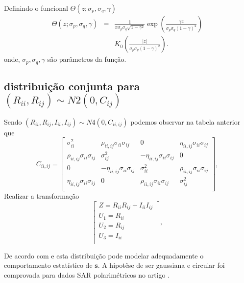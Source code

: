 Definindo o funcional $\Theta(z;\sigma_p,\sigma_q,\gamma)$
\begin{equation}
\begin{array}{ccc}
	\Theta(z;\sigma_p,\sigma_q,\gamma)&=&\frac{1}{\pi\sigma_p\sigma_q\sqrt{1-\gamma^2}}\exp\left(\frac{\gamma z}{\sigma_p\sigma_q(1-\gamma)^2}\right)\\
	&&K_0\left(\frac{|z|}{\sigma_p\sigma_q(1-\gamma)^2}\right).
\end{array}
\end{equation}
onde,  $\sigma_p,\sigma_q,\gamma$ são  parâmetros da função.
\subsection{distribuição conjunta para  $(R_{ii}, R_{ij})\sim N2(0, C_{ij})$}
Sendo $(R_{ii}, R_{ij},I_{ii}, I_{ij})\sim N4(0, C_{ii,ij})$ podemos observar na tabela anterior que 
\begin{equation}
C_{ii,ij}=\left[
\begin{array}{cccc}
	\sigma_{ii}^2   &  \rho_{ii,ij}\sigma_{ii}\sigma_{ij} & 0&\eta_{ii,ij}\sigma_{ii}\sigma_{ij}\\
	\rho_{ii,ij}\sigma_{ii}\sigma_{ij} & \sigma_{ij}^2  & -\eta_{ii,ij}\sigma_{ii}\sigma_{ij}&0 \\
	0&-\eta_{ii,ij}\sigma_{ii}\sigma_{ij}&\sigma_{ii}^2&\rho_{ii,ij}\sigma_{ii}\sigma_{ij}\\
	\eta_{ii,ij}\sigma_{ii}\sigma_{ij}&0&\rho_{ii,ij}\sigma_{ii}\sigma_{ij}&\sigma_{ij}^2\\
\end{array}
\right],
\end{equation}
Realizar a transformação 
\begin{equation}
\left[
\begin{array}{ccc}
	 Z = R_{ii}R_{ij}+I_{ii}I_{ij} \\
	 U_1 = R_{ii}\\
	 U_2 = R_{ij}\\
	 U_3 = I_{ii}\\
\end{array}
\right],
\end{equation}






De acordo com \citet{good} e \citet{lee} esta distribuição pode modelar adequadamente o comportamento estatístico de $\mathbf{s}$. A hipotêse de ser gaussiana e circular foi comprovada para dados SAR polarimétricos no artigo \citet{sarabendi}.   

